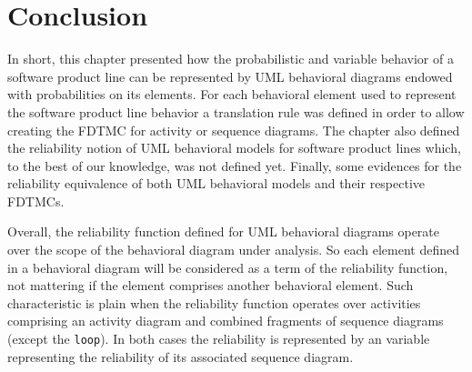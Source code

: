 \section{Conclusion \label{sec:modelingConclusion}}

In short, this chapter presented how the probabilistic and variable behavior of
a software product line can be represented by UML behavioral diagrams endowed
with probabilities on its elements. For each behavioral element used to
represent the software product line behavior a translation rule was defined in
order to allow creating the FDTMC for activity or sequence diagrams. The chapter
also defined the reliability notion of UML behavioral models for software
product lines which, to the best of our knowledge, was not defined yet. Finally,
some evidences for the reliability equivalence of both UML behavioral models and
their respective FDTMCs. 

Overall, the reliability function defined for UML behavioral diagrams operate
over the scope of the behavioral diagram under analysis. So each element defined
in a behavioral diagram will be considered as a term of the reliability
function, not mattering if the element comprises another behavioral element.
Such characteristic is plain when the reliability function operates over
activities comprising an activity diagram and combined fragments of sequence
diagrams (except the \texttt{loop}). In both cases the reliability is
represented by an variable representing the reliability of its associated
sequence diagram. 









